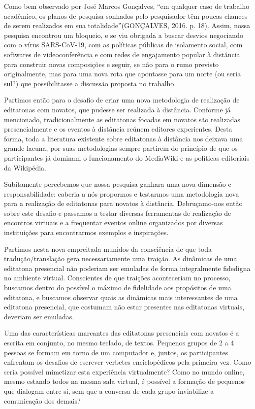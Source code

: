Como bem observado por José Marcos Gonçalves, ``em qualquer caso de trabalho acadêmico, os planos de pesquisa sonhados pelo pesquisador têm poucas chances de serem realizados em sua totalidade''(GONÇALVES, 2016. p. 18). Assim, nossa pesquisa encontrou um bloqueio, e se viu obrigada a buscar desvios negociando com o vírus SARS-CoV-19, com as políticas públicas de isolamento social, com softwares de videoconferência e com redes de engajamento popular à distância para construir novas composições e seguir, se não para o rumo previsto originalmente, mas para uma nova rota que apontasse para um norte (ou seria sul?) que possibilitasse a discussão proposta no trabalho.

Partimos então para o desafio de criar uma nova metodologia de realização de editatonas com novatos, que pudesse ser realizada à distância. Conforme já mencionado, tradicionalmente as editatonas focadas em novatos são realizadas presencialmente e os eventos à distância reúnem editores experientes. Desta forma, toda a literatura existente sobre editatonas à distância nos deixava uma grande lacuna, por suas metodologias sempre partirem do princípio de que os participantes já dominam o funcionamento do MediaWiki e as políticas editoriais da Wikipédia.

Subitamente percebemos que nossa pesquisa ganhara uma nova dimensão e responsabilidade: caberia a nós propormos e testarmos uma metodologia nova para a realização de editatonas para novatos à distância. Debruçamo-nos então sobre este desafio e passamos a testar diversas ferramentas de realização de encontros virtuais e a frequentar eventos online organizados por diversas instituições para encontrarmos exemplos e inspirações.

Partimos nesta nova empreitada munidos da consciência de que toda tradução/translação gera necessariamente uma traição. As dinâmicas de uma editatona presencial não poderiam ser emuladas de forma integralmente fidedigna no ambiente virtual. Conscientes de que traições aconteceriam no processo, buscamos dentro do possível o máximo de fidelidade aos propósitos de uma editatona, e buscamos observar quais as dinâmicas mais interessantes de uma editatona presencial, que costumam não estar presentes nas editatonas virtuais, deveriam ser emuladas.

Uma das características marcantes das editatonas presenciais com novatos é a escrita em conjunto, no mesmo teclado, de textos. Pequenos grupos de 2 a 4 pessoas se formam em torno de um computador e, juntos, os participantes enfrentam os desafios de escrever verbetes enciclopédicos pela primeira vez. Como seria possível mimetizar esta experiência virtualmente? Como no mundo online, mesmo estando todos na mesma sala virtual, é possível a formação de pequenos que dialogam entre si, sem que a conversa de cada grupo inviabilize a comunicação dos demais?

